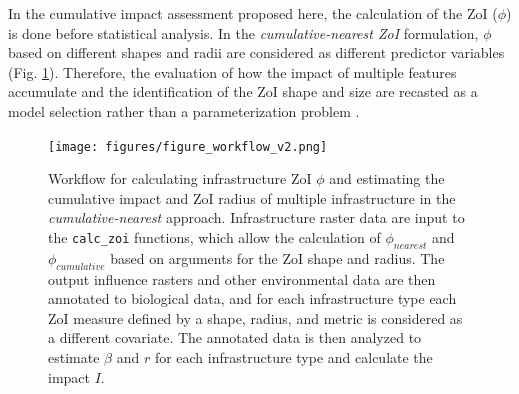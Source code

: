\documentclass[titlepage]{article}
\begin{document}
In the cumulative impact assessment proposed here, the calculation of the ZoI ($\phi$) is done before statistical analysis. In the \textit{cumulative-nearest ZoI} formulation, $\phi$ based on different shapes and radii are considered as different predictor variables (Fig. \ref{fig:workflow}). Therefore, the evaluation of how the impact of multiple features accumulate and the identification of the ZoI shape and size are recasted as a model selection rather than a parameterization problem \citep[such as in][]{lee_estimating_2020}.

\begin{figure}[h]
\centering
\texttt{[image: figures/figure\_workflow\_v2.png]}
\caption{\label{fig:workflow} Workflow for calculating infrastructure ZoI $\phi$ and estimating the cumulative impact and ZoI radius of multiple infrastructure in the \textit{cumulative-nearest} approach. Infrastructure raster data are input to the \texttt{calc\_zoi} functions, which allow the calculation 
of $\phi_{nearest}$ and $\phi_{cumulative}$ based on arguments for the ZoI shape and radius. The output influence rasters and other environmental data are then annotated to biological data, and for each infrastructure type each ZoI measure defined by a shape, radius, and metric is considered as a different covariate. The annotated data is then analyzed to estimate $\beta$ and $r$ for each infrastructure type and calculate the impact $I$.}
\end{figure}
\end{document}
